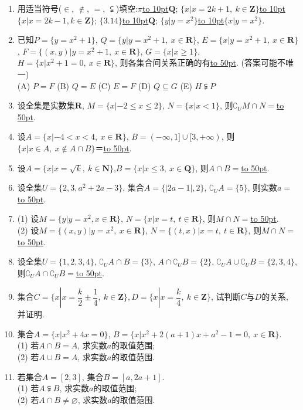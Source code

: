 \documentclass[10pt,a4paper]{article}
\newcommand{\blank}[1]{\underline{\hbox to #1pt{}}}
\begin{document}
\begin{enumerate}[1.]
\item 用适当符号($\in$, $\notin$, $=$, $\subsetneqq$)填空:$\pi$\blank{10}$\mathbf{Q}$; $\{x|x=2k+1, \ k\in \mathbf{Z}\}$\blank{10}$\{x|x=2k-1,k\in \mathbf{Z}\}$; $\{3.14\}$\blank{10}$\mathbf{Q}$; $\{y|y=x^2\}$\blank{10}$\{x|y=x^2\}$.  
\item 已知$P=\{y=x^2+1\}$, $Q=\{y|y=x^2+1, \ x\in \mathbf{R}\}$, $E=\{x|y=x^2+1, \  x\in \mathbf{R}\}$, $F=\{(x,y)|y=x^2+1, \ x\in \mathbf{R}\}$, $G=\{x|x\ge 1\}$, $H=\{x|x^2+1=0, \ x\in \mathbf{R}\}$, 则各集合间关系正确的有\blank{50}. (答案可能不唯一)\\
(A) $P=F$   (B) $Q=E$   (C) $E=F$   (D) $Q\subseteq G$  (E) $H\subsetneqq P$
\item 设全集是实数集$\mathbf{R}$, $M=\{x|-2 \le x\le 2\}$, $N=\{x|x<1\}$, 则$\complement_U M\cap N=$\blank{50}.
\item 设$A=\{x|-4<x<4, \ x\in \mathbf{R}\}$, $B=(-\infty,1]\cup [3,+\infty)$, 则$\{x|x\in A, \ x\notin A\cap B  \}$＝\blank{50}.
\item 设$A=\{x|x=\sqrt k, \ k\in \mathbf{N}\}$,$B=\{x|x\le 3,\ x\in \mathbf{Q}\}$, 则$A\cap B=$\blank{50}.
\item 设全集$U=\{2,3,a^2+2a-3\}$, 集合$A=\{|2a-1|,2\}$, $\complement_U A=\{5\}$, 则实数$a=$\blank{50}.
\item (1) 设$M=\{y|y=x^2, x\in \mathbf{R}\}$, $N=\{x|x=t,\ t\in \mathbf{R}\}$, 则$M\cap N=$\blank{50}.\\
(2) 设$M=\{(x,y)|y=x^2,\ x\in \mathbf{R}\}$, $N=\{(t,x)|x=t,\ t\in \mathbf{R}\}$, 则$M\cap N=$\blank{50}.
\item 设全集$U=\{1,2,3,4\}$, $\complement_U A\cap B=\{3\}$, $A\cap \complement_U B=\{2\}$, $\complement_U A\cup \complement_U B=\{2,3,4\}$, 则$\complement_U A\cap \complement_U B=$\blank{50}.
\item 集合$C=\{x|x=\dfrac k2\pm \dfrac14, \ k\in \mathbf{Z}\},D=\{x|x=\dfrac k4,\ k\in \mathbf{Z}\}$, 试判断$C$与$D$的关系, 并证明.
\item 集合$A=\{x|x^2+4x=0\}$, $B=\{x|x^2+2(a+1)x+a^2-1=0,\ x\in \mathbf{R}\}$.\\
(1) 若$A\cap B=A$, 求实数$a$的取值范围;\\
(2) 若$A\cup B=A$, 求实数$a$的取值范围.
\item 若集合$A=[2,3]$, 集合$B=[a,2a+1]$.\\
(1) 若$A\subsetneqq B$, 求实数$a$的取值范围;\\
(2) 若$A\cap B\ne \varnothing$, 求实数$a$的取值范围.

\end{enumerate}
\end{document}
